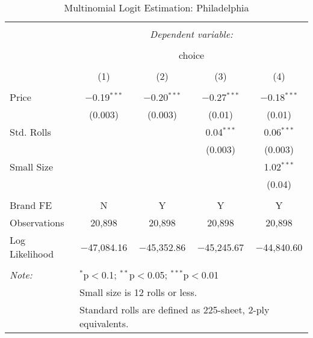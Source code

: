 
\begin{table}[!htbp] \centering 
  \caption{Multinomial Logit Estimation: Philadelphia} 
  \label{tab:mnlPhiladelphiaBaseline} 
\begin{tabular}{@{\extracolsep{5pt}}lcccc} 
\\[-1.8ex]\hline 
\hline \\[-1.8ex] 
 & \multicolumn{4}{c}{\textit{Dependent variable:}} \\ 
\cline{2-5} 
\\[-1.8ex] & \multicolumn{4}{c}{choice} \\ 
\\[-1.8ex] & (1) & (2) & (3) & (4)\\ 
\hline \\[-1.8ex] 
 Price & $-$0.19$^{***}$ & $-$0.20$^{***}$ & $-$0.27$^{***}$ & $-$0.18$^{***}$ \\ 
  & (0.003) & (0.003) & (0.01) & (0.01) \\ 
  Std. Rolls &  &  & 0.04$^{***}$ & 0.06$^{***}$ \\ 
  &  &  & (0.003) & (0.003) \\ 
  Small Size &  &  &  & 1.02$^{***}$ \\ 
  &  &  &  & (0.04) \\ 
 \hline \\[-1.8ex] 
Brand FE & N & Y & Y & Y \\ 
Observations & 20,898 & 20,898 & 20,898 & 20,898 \\ 
Log Likelihood & $-$47,084.16 & $-$45,352.86 & $-$45,245.67 & $-$44,840.60 \\ 
\hline 
\hline \\[-1.8ex] 
\textit{Note:}  & \multicolumn{4}{l}{$^{*}$p$<$0.1; $^{**}$p$<$0.05; $^{***}$p$<$0.01} \\ 
 & \multicolumn{4}{l}{Small size is 12 rolls or less.} \\ 
 & \multicolumn{4}{l}{Standard rolls are defined as 225-sheet, 2-ply equivalents.} \\ 
\end{tabular} 
\end{table} 
